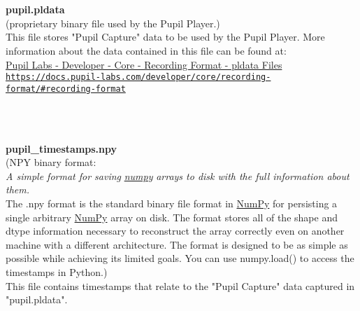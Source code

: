 \begin{description}
\begin{addmargin}[0em]{0em}
    \textbf{\\\\}
    \begin{addmargin}[1em]{0em} %
        \label{pupil.pldata}
        \textbf{pupil.pldata}\\(proprietary binary file used by the Pupil Player.)\\
        This file stores "Pupil Capture" data to be used by the Pupil Player.
        More information about the data contained in this file can be found at:\\
        \href{https://docs.pupil-labs.com/developer/core/recording-format/#recording-format}
        {{Pupil Labs - Developer - Core - Recording Format - pldata Files}\\\nolinkurl{https://docs.pupil-labs.com/developer/core/recording-format/\#recording-format}}
    \end{addmargin} %

    \textbf{\\\\}
    \begin{addmargin}[1em]{0em} %
        \label{pupil_timestamps.npy}
        \textbf{pupil\_timestamps.npy}\\
        (NPY binary format:\\
        \textit{A simple format for saving}
        \href{https://numpy.org/doc/stable/reference/generated/numpy.lib.format.html#module-numpy.lib.format}{\textit{numpy}}
        \textit{arrays to disk with the full information about them.}\\
        The .npy format is the standard binary file format in 
        \href{https://numpy.org/doc/stable/reference/generated/numpy.lib.format.html#module-numpy.lib.format}{NumPy}
        for persisting a single arbitrary
        \href{https://numpy.org/doc/stable/reference/generated/numpy.lib.format.html#module-numpy.lib.format}{NumPy}
        array on disk. The format stores all of the shape and dtype information necessary to
        reconstruct the array correctly even on another machine with a different architecture.
        The format is designed to be as simple as possible while achieving its limited goals.
        You can use numpy.load() to access the timestamps in Python.)\\
        This file contains timestamps that relate to the "Pupil Capture" data captured in "pupil.pldata". 
    \end{addmargin} %


\end{addmargin}
\end{description}
